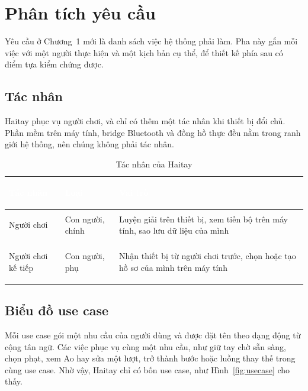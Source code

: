 \section{Phân tích yêu cầu}
\label{sec:req}
Yêu cầu ở Chương~1 mới là danh sách việc hệ thống phải làm. Pha này gắn mỗi việc với một người thực hiện và một kịch bản cụ thể, để thiết kế phía sau có điểm tựa kiểm chứng được.

\subsection{Tác nhân}
Haitay phục vụ người chơi, và chỉ có thêm một tác nhân khi thiết bị đổi chủ. Phần mềm trên máy tính, bridge Bluetooth và đồng hồ thực đều nằm trong ranh giới hệ thống, nên chúng không phải tác nhân.

\begin{table}[H]
    \centering
    \renewcommand{\arraystretch}{1.4}
    \caption{Tác nhân của Haitay}
    \label{tab:actors}
    \begin{tabular}{>{\bfseries\raggedright\arraybackslash}m{3.4cm} >{\raggedright\arraybackslash}m{2.4cm} >{\raggedright\arraybackslash}m{8.4cm}}
        \toprule
        \rowcolor{haitayblue}
        \textcolor{white}{Tác nhân} & \textcolor{white}{Loại} & \textcolor{white}{Vai trò} \\
        \midrule
        \rowcolor{haitayblue!8}
        Người chơi & Con người, chính & Luyện giải trên thiết bị, xem tiến bộ trên máy tính, sao lưu dữ liệu của mình \\
        Người chơi kế tiếp & Con người, phụ & Nhận thiết bị từ người chơi trước, chọn hoặc tạo hồ sơ của mình trên máy tính \\
        \bottomrule
    \end{tabular}
\end{table}

\subsection{Biểu đồ use case}
Mỗi use case gói một nhu cầu của người dùng và được đặt tên theo dạng động từ cộng tân ngữ. Các việc phục vụ cùng một nhu cầu, như giữ tay chờ sẵn sàng, chọn phạt, xem Ao hay sửa một lượt, trở thành bước hoặc luồng thay thế trong cùng use case. Nhờ vậy, Haitay chỉ có bốn use case, như Hình~\ref{fig:usecase} cho thấy.

